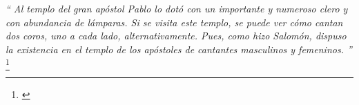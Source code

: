 \textit{``
	Al templo del gran apóstol Pablo lo dotó con un importante y
	numeroso clero y con abundancia de lámparas. Si se visita este
	templo, se puede ver cómo cantan dos coros, uno a cada lado,
	alternativamente. Pues, como hizo Salomón, dispuso la existencia
	en el templo de los apóstoles de cantantes masculinos y femeninos.
	''}
\footnote{\cite[p.~608]{alexiadaXV}}


































